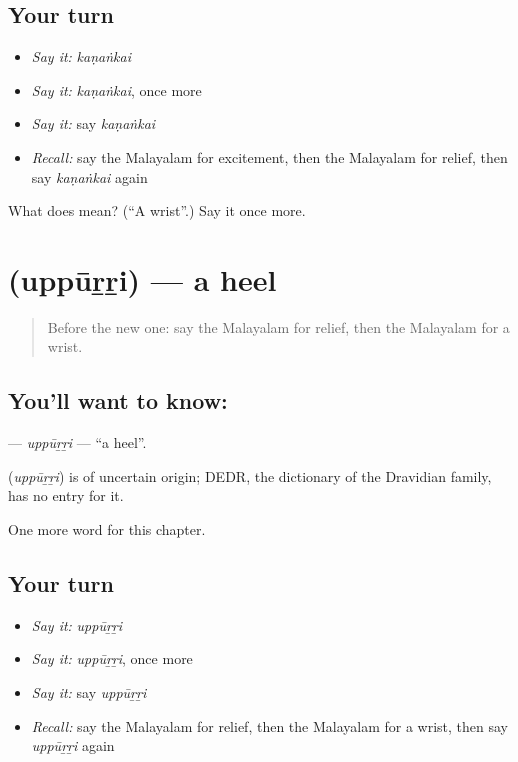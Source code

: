 \subsection*{Your turn}
\begin{itemize}
\raggedright
  \item \emph{Say it:} \emph{kaṇaṅkai}
  \item \emph{Say it:} \emph{kaṇaṅkai}, once more
  \item \emph{Say it:} say \emph{kaṇaṅkai}
  \item \emph{Recall:} say the Malayalam for excitement, then the Malayalam for relief, then say \emph{kaṇaṅkai} again
\end{itemize}

\begin{tcolorbox}[breakable,colback=teal!4,colframe=teal!35!black,title={Before you move on}]
What does  mean? (\textquotedblleft{}A wrist\textquotedblright{}.) Say it once more.
\end{tcolorbox}
\section[\texorpdfstring{\ml{ഉപ്പൂറ്റി} (uppūṟṟi)}{ഉപ്പൂറ്റി (uppūṟṟi)}]{ (uppūṟṟi) — a heel}

\label{lesson:ML-C235-uppurri}



\begin{quote}
Before the new one: say the Malayalam for relief, then the Malayalam for a wrist.
\end{quote}

\subsection*{You'll want to know: }
\textbf{} — \emph{uppūṟṟi} — \textquotedblleft{}a heel\textquotedblright{}.

\begin{cousinweb}
\textbf{} (\emph{uppūṟṟi}) is of uncertain origin; DEDR, the dictionary of the Dravidian family, has no entry for it.
\end{cousinweb}

\begin{grammarlens}[title={What you've built}]
One more word for this chapter.
\end{grammarlens}

\subsection*{Your turn}
\begin{itemize}
\raggedright
  \item \emph{Say it:} \emph{uppūṟṟi}
  \item \emph{Say it:} \emph{uppūṟṟi}, once more
  \item \emph{Say it:} say \emph{uppūṟṟi}
  \item \emph{Recall:} say the Malayalam for relief, then the Malayalam for a wrist, then say \emph{uppūṟṟi} again
\end{itemize}

